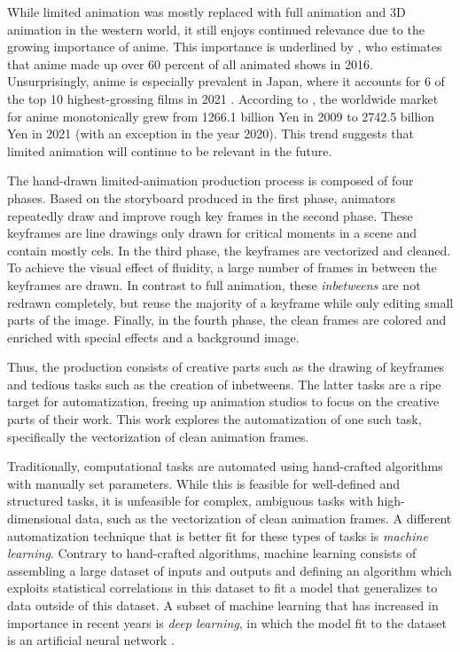 While limited animation was mostly replaced with full animation and 3D animation in the western world, it still enjoys continued relevance due to the growing importance of anime. This importance is underlined by \citet{napier2016anime}, who estimates that anime made up over 60 percent of all animated shows in 2016. Unsurprisingly, anime is especially prevalent in Japan, where it accounts for 6 of the top 10 highest-grossing films in 2021 \citep{jpboxoffice}. According to \citet{animeindustryreport}, the worldwide market for anime monotonically grew from 1266.1 billion Yen in 2009 to 2742.5 billion Yen in 2021 (with an exception in the year 2020). This trend suggests that limited animation will continue to be relevant in the future.

The hand-drawn limited-animation production process is composed of four phases. Based on the storyboard produced in the first phase, animators repeatedly draw and improve rough key frames in the second phase. These keyframes are line drawings only drawn for critical moments in a scene and contain mostly cels. In the third phase, the keyframes are vectorized and cleaned. To achieve the visual effect of fluidity, a large number of frames in between the keyframes are drawn. In contrast to full animation, these \emph{inbetweens} are not redrawn completely, but reuse the majority of a keyframe while only editing small parts of the image. Finally, in the fourth phase, the clean frames are colored and enriched with special effects and a background image.

Thus, the production consists of creative parts such as the drawing of keyframes and tedious tasks such as the creation of inbetweens. The latter tasks are a ripe target for automatization, freeing up animation studios to focus on the creative parts of their work. This work explores the automatization of one such task, specifically the vectorization of clean animation frames.

Traditionally, computational tasks are automated using hand-crafted algorithms with manually set parameters. While this is feasible for well-defined and structured tasks, it is unfeasible for complex, ambiguous tasks with high-dimensional data, such as the vectorization of clean animation frames. A different automatization technique that is better fit for these types of tasks is \emph{machine learning}. Contrary to hand-crafted algorithms, machine learning consists of assembling a large dataset of inputs and outputs and defining an algorithm which exploits statistical correlations in this dataset to fit a model that generalizes to data outside of this dataset. A subset of machine learning that has increased in importance in recent years is \emph{deep learning}, in which the model fit to the dataset is an artificial neural network \citep{Rosenblatt58theperceptron}.

